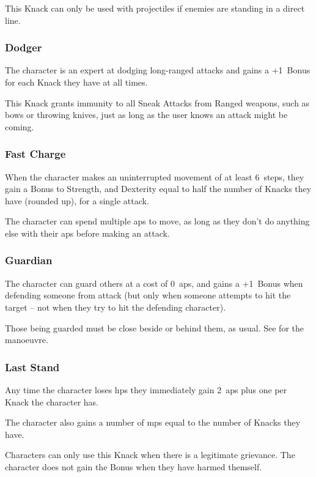 \begin{multicols}{2}
This Knack can only be used with \gls{projectiles} if enemies are standing in a direct line.

\subsubsection{Dodger}
\label{dodger}

The character is an expert at dodging long-ranged attacks and gains a +1~Bonus for each Knack they have at all times.

This Knack grants immunity to all Sneak Attacks from Ranged weapons, such as bows or throwing knives, just as long as the user knows an attack might be coming.

\subsubsection{Fast Charge}

When the character makes an uninterrupted movement of at least 6~\glspl{step}, they gain a Bonus to Strength, and Dexterity equal to half the number of Knacks they have (rounded up), for a single attack.

The character can spend multiple \glspl{ap} to move, as long as they don't do anything else with their \glspl{ap} before making an attack.

\subsubsection{Guardian}

The character can guard others at a cost of 0~\glspl{ap}, and gains a +1~Bonus when defending someone from attack (but only when someone attempts to hit the target -- not when they try to hit the defending character).

Those being guarded must be close beside or behind them, as usual.
See  for the manoeuvre.

\subsubsection{Last Stand}

Any time the character loses \glspl{hp} they immediately gain 2~\glspl{ap} plus one per Knack the character has.

The character also gains a number of \glspl{mp} equal to the number of Knacks they have.

Characters can only use this Knack when there is a legitimate grievance.
The character does not gain the Bonus when they have harmed themself.


\end{multicols}
